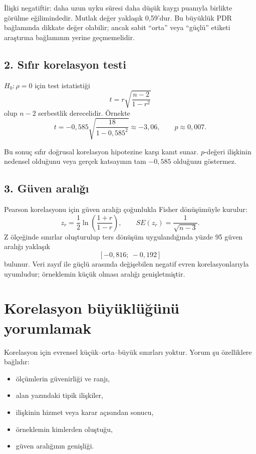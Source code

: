 İlişki negatiftir: daha uzun uyku süresi daha düşük kaygı puanıyla birlikte
görülme eğilimindedir. Mutlak değer yaklaşık 0,59'dur. Bu büyüklük PDR
bağlamında dikkate değer olabilir; ancak sabit ``orta'' veya ``güçlü'' etiketi
araştırma bağlamının yerine geçmemelidir.

\subsection*{2. Sıfır korelasyon testi}

$H_0:\rho=0$ için test istatistiği
\[
t=r\sqrt{\frac{n-2}{1-r^2}}
\]
olup $n-2$ serbestlik derecelidir. Örnekte
\[
t=-0{,}585\sqrt{\frac{18}{1-0{,}585^2}}
\approx-3{,}06,
\qquad p\approx0{,}007.
\]

Bu sonuç sıfır doğrusal korelasyon hipotezine karşı kanıt sunar. $p$-değeri
ilişkinin nedensel olduğunu veya gerçek katsayının tam $-0{,}585$ olduğunu
göstermez.

\subsection*{3. Güven aralığı}

Pearson korelasyonu için güven aralığı çoğunlukla Fisher dönüşümüyle kurulur:
\[
z_r=\frac12\ln\left(\frac{1+r}{1-r}\right),
\qquad
SE(z_r)=\frac{1}{\sqrt{n-3}}.
\]
Z ölçeğinde sınırlar oluşturulup ters dönüşüm uygulandığında yüzde 95 güven
aralığı yaklaşık
\[
[-0{,}816;\ -0{,}192]
\]
bulunur. Veri zayıf ile güçlü arasında değişebilen negatif evren
korelasyonlarıyla uyumludur; örneklemin küçük olması aralığı genişletmiştir.

\section{Korelasyon büyüklüğünü yorumlamak}

Korelasyon için evrensel küçük--orta--büyük sınırları yoktur. Yorum şu
özelliklere bağlıdır:

\begin{itemize}
  \item ölçümlerin güvenirliği ve ranjı,
  \item alan yazındaki tipik ilişkiler,
  \item ilişkinin hizmet veya karar açısından sonucu,
  \item örneklemin kimlerden oluştuğu,
  \item güven aralığının genişliği.
\end{itemize}

